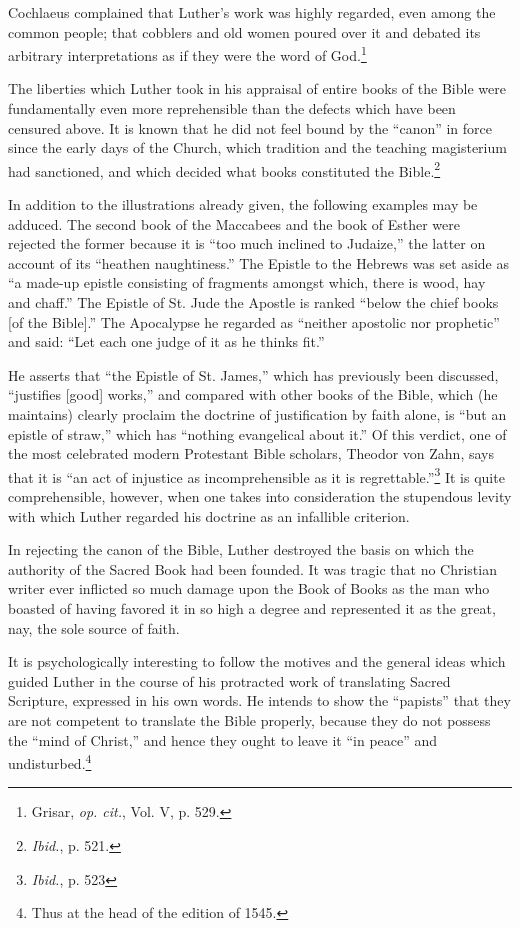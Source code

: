Cochlaeus complained that Luther’s work was highly regarded,
even among the common people; that cobblers and old women poured
over it and debated its arbitrary interpretations as if they were the
word of God.\footnote{Grisar, \textit{op. cit.}, Vol. V, p. 529.}

The liberties which Luther took in his appraisal of entire books of
the Bible were fundamentally even more reprehensible than the defects
which have been censured above. It is known that he did not feel
bound by the “canon” in force since the early days of the Church,
which tradition and the teaching magisterium had sanctioned, and
which decided what books constituted the Bible.\footnote{\textit{Ibid.}, p. 521.}

In addition to the illustrations already given, the following examples may
be adduced. The second book of the Maccabees and the book of Esther were
rejected the former because it is “too much inclined to Judaize,” the latter
on account of its “heathen naughtiness.” The Epistle to the Hebrews was
set aside as “a made-up epistle consisting of fragments amongst which,
there is wood, hay and chaff.” The Epistle of St. Jude the Apostle is
ranked “below the chief books [of the Bible].” The Apocalypse he regarded
as “neither apostolic nor prophetic” and said: “Let each one judge of it as he
thinks fit.”

He asserts that “the Epistle of St. James,” which has previously been discussed,
“justifies [good] works,” and compared with other books of the
Bible, which (he maintains) clearly proclaim the doctrine of justification
by faith alone, is “but an epistle of straw,” which has “nothing
evangelical about it.” Of this verdict, one of the most celebrated modern
Protestant Bible scholars, Theodor von Zahn, says that it is “an act of injustice
as incomprehensible as it is regrettable.”\footnote{\textit{Ibid.}, p. 523}
 It is quite comprehensible,
however, when one takes into consideration the stupendous levity with which
Luther regarded his doctrine as an infallible criterion.

In rejecting the canon of the Bible, Luther destroyed the basis on
which the authority of the Sacred Book had been founded. It was
tragic that no Christian writer ever inflicted so much damage upon
the Book of Books as the man who boasted of having favored it in so
high a degree and represented it as the great, nay, the sole source of
faith.

It is psychologically interesting to follow the motives and the
general ideas which guided Luther in the course of his protracted
work of translating Sacred Scripture, expressed in his own words.
He intends to show the “papists” that they are not competent to
translate the Bible properly, because they do not possess the “mind of
Christ,” and hence they ought to leave it “in peace” and undisturbed.\footnote{Thus at the head of the edition of 1545.}


